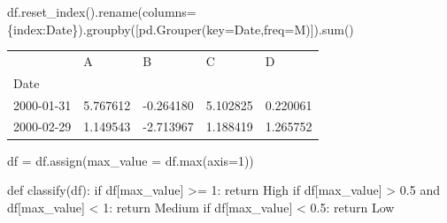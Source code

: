 \documentclass[
  letterpaper,
  DIV=11,
  numbers=noendperiod]{scrartcl}
\newenvironment{Shaded}{\begin{snugshade}}{\end{snugshade}}
\newcommand{\BuiltInTok}[1]{\textcolor[rgb]{0.00,0.23,0.31}{#1}}
\newcommand{\ControlFlowTok}[1]{\textcolor[rgb]{0.00,0.23,0.31}{#1}}
\newcommand{\DecValTok}[1]{\textcolor[rgb]{0.68,0.00,0.00}{#1}}
\newcommand{\FloatTok}[1]{\textcolor[rgb]{0.68,0.00,0.00}{#1}}
\newcommand{\KeywordTok}[1]{\textcolor[rgb]{0.00,0.23,0.31}{#1}}
\newcommand{\NormalTok}[1]{\textcolor[rgb]{0.00,0.23,0.31}{#1}}
\newcommand{\OperatorTok}[1]{\textcolor[rgb]{0.37,0.37,0.37}{#1}}
\newcommand{\StringTok}[1]{\textcolor[rgb]{0.13,0.47,0.30}{#1}}
\begin{document}
\begin{Shaded}
\begin{Highlighting}[]

\NormalTok{df.reset\_index().rename(columns}\OperatorTok{=}\NormalTok{\{}\StringTok{\textquotesingle{}index\textquotesingle{}}\NormalTok{:}\StringTok{\textquotesingle{}Date\textquotesingle{}}\NormalTok{\}).groupby([pd.Grouper(key}\OperatorTok{=}\StringTok{\textquotesingle{}Date\textquotesingle{}}\NormalTok{,freq}\OperatorTok{=}\StringTok{\textquotesingle{}M\textquotesingle{}}\NormalTok{)]).}\BuiltInTok{sum}\NormalTok{()}
\end{Highlighting}
\end{Shaded}

\begin{longtable}[]{@{}lllll@{}}
\toprule()
& A & B & C & D \\
Date & & & & \\
\midrule()
\endhead
2000-01-31 & 5.767612 & -0.264180 & 5.102825 & 0.220061 \\
2000-02-29 & 1.149543 & -2.713967 & 1.188419 & 1.265752 \\
\bottomrule()
\end{longtable}

\begin{Shaded}
\begin{Highlighting}[]

\NormalTok{df }\OperatorTok{=}\NormalTok{ df.assign(max\_value }\OperatorTok{=}\NormalTok{ df.}\BuiltInTok{max}\NormalTok{(axis}\OperatorTok{=}\DecValTok{1}\NormalTok{))}
\end{Highlighting}
\end{Shaded}

\begin{Shaded}
\begin{Highlighting}[]

\KeywordTok{def}\NormalTok{ classify(df):}
    \ControlFlowTok{if}\NormalTok{ df[}\StringTok{\textquotesingle{}max\_value\textquotesingle{}}\NormalTok{] }\OperatorTok{\textgreater{}=} \DecValTok{1}\NormalTok{:}
        \ControlFlowTok{return} \StringTok{\textquotesingle{}High\textquotesingle{}}
    \ControlFlowTok{if}\NormalTok{ df[}\StringTok{\textquotesingle{}max\_value\textquotesingle{}}\NormalTok{] }\OperatorTok{\textgreater{}} \FloatTok{0.5} \KeywordTok{and}\NormalTok{ df[}\StringTok{\textquotesingle{}max\_value\textquotesingle{}}\NormalTok{] }\OperatorTok{\textless{}} \DecValTok{1}\NormalTok{:}
        \ControlFlowTok{return} \StringTok{\textquotesingle{}Medium\textquotesingle{}}
    \ControlFlowTok{if}\NormalTok{ df[}\StringTok{\textquotesingle{}max\_value\textquotesingle{}}\NormalTok{] }\OperatorTok{\textless{}} \FloatTok{0.5}\NormalTok{:}
        \ControlFlowTok{return} \StringTok{\textquotesingle{}Low\textquotesingle{}}
\end{Highlighting}
\end{Shaded}
\end{document}
